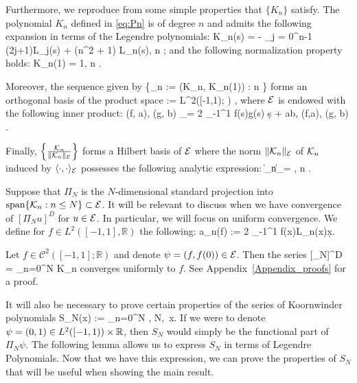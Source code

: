 Furthermore, we reproduce from \cite[Prop.~3.1]{CGLW16} some simple properties that \(\{K_n\}\) satisfy.
\bprop
The polynomial \(K_n\) defined in \eqref{eq:Pn} is of degree \(n\) and  admits the following expansion in terms of the Legendre polynomials:
\be\label{eq:Pn2}
    K_n(s) = - \sum_{j = 0}^{n-1} (2j+1)L_j(s) + (n^2 + 1) L_n(s), \qquad n \in \Nzero;
\ee
and the following normalization property holds:
\be
    K_n(1) = 1, \qquad n \in \Nzero.
\ee

Moreover, the sequence given by
\be
    \{_n := (K_n, K_n(1)) : n \in \Nzero\}
\ee 
forms an orthogonal basis of the  product space 
\be
     := L^2([-1,1); \R) \times  \R,
\ee 
where \(\mathcal E\) is endowed with the following inner product:
\be
    \langle (f, a), (g, b) \rangle_\mcE =  2 \int_{-1}^1 f(s)g(s) \d s  + ab, \quad (f,a), (g, b) \in \mcE.
\ee

Finally, \(\left\{ \frac{\mathcal K_n}{\| \mathcal K_n \|_\mathcal E} \right\}\) forms a Hilbert basis of $\mathcal E$ where 
the norm \(\| \mathcal K_n \|_\mathcal E\) of \(\mathcal K_n\) induced by  \(\langle \cdot, \cdot \rangle_\mathcal E\)  possesses the following analytic expression:
\be \label{eq:Pn_norm}
    \|\mcK_n\|_\mcE = , \qquad n \in \Nzero.
\ee
\eprop

Suppose that \(\Pi_N\) is the \(N\)-dimensional standard projection into \(\mbox{span}\{\mathcal K_n: n\leq N\} \subset \mathcal E\). It will be relevant to discuss when we have convergence of \([\Pi_N u]^D\) for \(u\in\mathcal E\). In particular, we will focus on uniform convergence. {\attn We define for \(f\in L^2([-1,1], \mathbb R)\) the following}:
\be
a_n(f) :=  2 \int_{-1}^1 f(x)L_n(x)\d x.
\ee

\bprop\label{prop:uniform-conv}
Let \(f\in \mathcal C^2([-1,1];\mathbb R)\) and denote \(\psi = (f, f(0)) \in\mathcal E\). Then the series
\be\label{koorn-series}
    [\Pi_N\psi]^D = \sum_{n=0}^N  K_n
\ee
converges uniformly to \(f\).
\eprop
See Appendix~\ref{Appendix_proofs} for a proof.

It will also be necessary to prove certain properties of the series of Koornwinder polynomials
\be\label{eq:SN}
    S_N(x) := \sum_{n=0}^N , \quad N\in\Nzero,\  x\in[-1,1].
\ee
If we were to denote \(\psi = (0,1) \in L^2([-1,1)) \times \mathbb R\), then \(S_N\) would simply be the functional part of \(\Pi_N\psi\). {\attn The following lemma allows us to express \(S_N\) in terms of Legendre Polynomials. Now that we have this expression, we can prove the properties of \(S_N\) that will be useful when showing the main result.}


